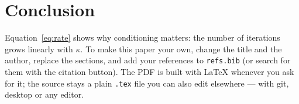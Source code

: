 \documentclass[11pt]{article}
\begin{document}
\section{Conclusion}

Equation~\eqref{eq:rate} shows why conditioning matters: the number of iterations grows linearly with $\kappa$. To make this paper your own, change the title and the author, replace the sections, and add your references to \texttt{refs.bib} (or search for them with the citation button). The PDF is built with \LaTeX{} whenever you ask for it; the source stays a plain \texttt{.tex} file you can also edit elsewhere --- with git, desktop \LyX{} or any editor.



\end{document}

